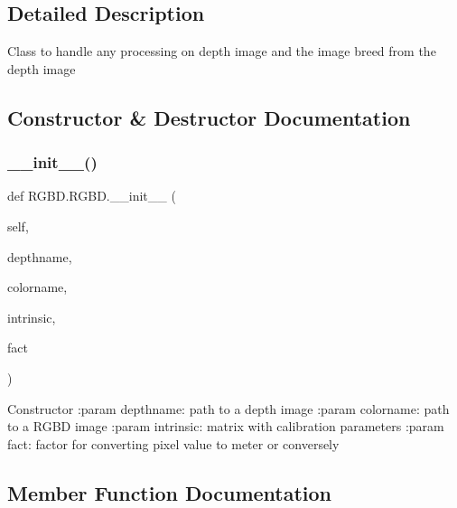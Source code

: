 \subsection{Detailed Description}
\begin{DoxyVerb}Class to handle any processing on depth image and the image breed from the depth image
\end{DoxyVerb}
 

\subsection{Constructor \& Destructor Documentation}
\mbox{\label{class_r_g_b_d_1_1_r_g_b_d_adf3e96f8b0620fd3f68b2399d29c3b12}} 
\subsubsection{\texorpdfstring{\+\_\+\+\_\+init\+\_\+\+\_\+()}{\_\_init\_\_()}}
{\footnotesize\ttfamily def R\+G\+B\+D.\+R\+G\+B\+D.\+\_\+\+\_\+init\+\_\+\+\_\+ (\begin{DoxyParamCaption}\item[{}]{self,  }\item[{}]{depthname,  }\item[{}]{colorname,  }\item[{}]{intrinsic,  }\item[{}]{fact }\end{DoxyParamCaption})}

\begin{DoxyVerb}Constructor
:param depthname: path to a depth image
:param colorname: path to a RGBD image
:param intrinsic: matrix with calibration parameters
:param fact: factor for converting pixel value to meter or conversely
\end{DoxyVerb}
 

\subsection{Member Function Documentation}
\mbox{\label{class_r_g_b_d_1_1_r_g_b_d_aa1f7a6e1fa3435e33b779f2b3cd983fd}} 
